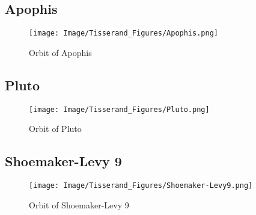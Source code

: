 \documentclass{article}
\begin{document}
\subsection{Apophis}
\begin{figure}[htbp]
    \centering
    \texttt{[image: Image/Tisserand\_Figures/Apophis.png]}
    \caption{Orbit of Apophis}
    \label{fig:enter-label}
\end{figure}
\subsection{Pluto}
\begin{figure}[htbp]
    \centering
    \texttt{[image: Image/Tisserand\_Figures/Pluto.png]}
    \caption{Orbit of Pluto}
    \label{fig:enter-label}
\end{figure}
\newpage
\subsection{Shoemaker-Levy 9}
\begin{figure}[htbp]
    \centering
    \texttt{[image: Image/Tisserand\_Figures/Shoemaker-Levy9.png]}
    \caption{Orbit of Shoemaker-Levy 9}
    \label{fig:enter-label}
\end{figure}

\newpage


\end{document}
